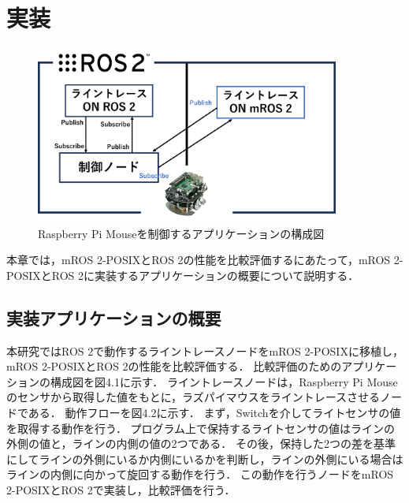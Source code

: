 \chapter{実装}
\begin{figure}[ht]
    \centering
    \includegraphics[width=10cm]{images/fig4_mros2_ros2_raspimouse_configuration.png}
    \caption{Raspberry Pi Mouseを制御するアプリケーションの構成図}
    \label{fig:raspimouse_configuration}
\end{figure}
\label{chap:implementation}
本章では，mROS 2-POSIXとROS 2の性能を比較評価するにあたって，mROS 2-POSIXとROS 2に実装するアプリケーションの概要について説明する．
\section{実装アプリケーションの概要}
本研究ではROS 2で動作するライントレースノードをmROS 2-POSIXに移植し，mROS 2-POSIXとROS 2の性能を比較評価する．
比較評価のためのアプリケーションの構成図を図4.1に示す．
ライントレースノードは，Raspberry Pi Mouseのセンサから取得した値をもとに，ラズパイマウスをライントレースさせるノードである．
動作フローを図4.2に示す．
まず，Switchを介してライトセンサの値を取得する動作を行う．
プログラム上で保持するライトセンサの値はラインの外側の値と，ラインの内側の値の2つである．
その後，保持した2つの差を基準にしてラインの外側にいるか内側にいるかを判断し，ラインの外側にいる場合はラインの内側に向かって旋回する動作を行う．
この動作を行うノードをmROS 2-POSIXとROS 2で実装し，比較評価を行う．
